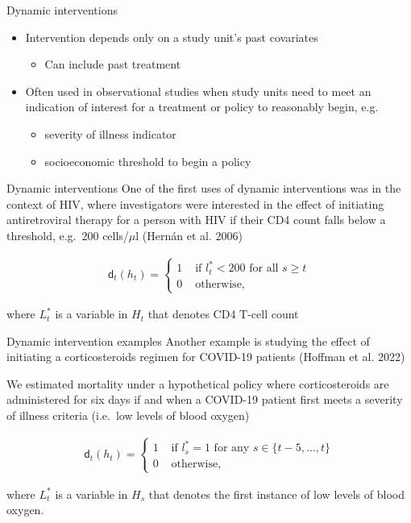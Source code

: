 \documentclass[
  10pt,
  ignorenonframetext,
]{beamer}
\providecommand{\tightlist}{%
  \setlength{\itemsep}{0pt}\setlength{\parskip}{0pt}}\usepackage{longtable,booktabs,array}
\begin{document}
\begin{frame}{Dynamic interventions}
\protect\hypertarget{dynamic-interventions}{}
\begin{itemize}
\tightlist
\item
  Intervention depends only on a study unit's past covariates

  \begin{itemize}
  \tightlist
  \item
    Can include past treatment
  \end{itemize}
\item
  Often used in observational studies when study units need to meet an
  indication of interest for a treatment or policy to reasonably begin,
  e.g.

  \begin{itemize}
  \tightlist
  \item
    severity of illness indicator
  \item
    socioeconomic threshold to begin a policy
  \end{itemize}
\end{itemize}
\end{frame}

\begin{frame}{Dynamic interventions}
\protect\hypertarget{dynamic-interventions-1}{}
One of the first uses of dynamic interventions was in the context of
HIV, where investigators were interested in the effect of initiating
antiretroviral therapy for a person with HIV if their CD4 count falls
below a threshold, e.g.~200 cells/\(\mu\)l (Hernán et al. 2006)

\begin{align*}
\mathsf{d}_t(h_t)=\begin{cases}
      1 &\text{ if } l_t^*<200 \text{ for all } s \ge t\\
      0&\text{ otherwise,}
\end{cases}
\end{align*}

where \(L_t^*\) is a variable in \(H_t\) that denotes CD4 T-cell count
\end{frame}

\begin{frame}{Dynamic intervention examples}
\protect\hypertarget{dynamic-intervention-examples}{}
Another example is studying the effect of initiating a corticosteroids
regimen for COVID-19 patients (Hoffman et al. 2022)

We estimated mortality under a hypothetical policy where corticosteroids
are administered for six days if and when a COVID-19 patient first meets
a severity of illness criteria (i.e.~low levels of blood oxygen)

\begin{align}
\mathsf{d}_t(h_t)=\begin{cases}
      1 &\text{ if } l_s^*=1 \text{ for any } s\in\{t-5,\ldots, t\}\\
      0&\text{ otherwise,}
\end{cases}
\end{align}

where \(L_t^*\) is a variable in \(H_s\) that denotes the first instance
of low levels of blood oxygen.
\end{frame}
\end{document}
